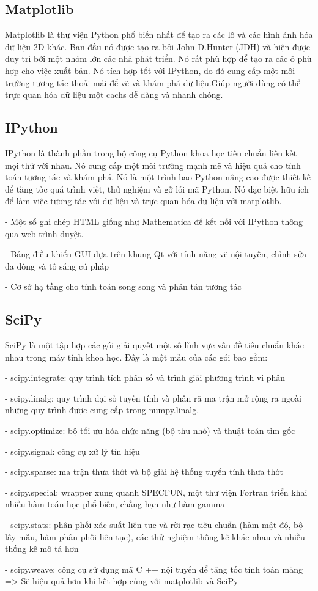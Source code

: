 \subsection{Matplotlib}
\quad Matplotlib là thư viện Python phổ biến nhất để tạo ra các lô và các hình ảnh hóa dữ liệu 2D khác. Ban đầu nó được tạo ra bởi John D.Hunter (JDH) và hiện được duy trì bởi một nhóm lớn các nhà phát triển. Nó rất phù hợp để tạo ra các ô phù hợp cho việc xuất bản. Nó tích hợp tốt với IPython, do đó cung cấp một môi trường tương tác thoải mái để vẽ và khám phá dữ liệu.Giúp người dùng có thể trực quan hóa dữ liệu một cachs dễ dàng và nhanh chóng.

\subsection{IPython}
\quad IPython là thành phần trong bộ công cụ Python khoa học tiêu chuẩn liên kết mọi thứ với nhau. Nó cung cấp một môi trường mạnh mẽ và hiệu quả cho tính toán tương tác và khám phá. Nó là một trình bao Python nâng cao được thiết kế để tăng tốc quá trình viết, thử nghiệm và gỡ lỗi mã Python. Nó đặc biệt hữu ích để làm việc tương tác với dữ liệu và trực quan hóa dữ liệu với matplotlib.\par
- Một sổ ghi chép HTML giống như Mathematica để kết nối với IPython thông qua web
trình duyệt.\par
- Bảng điều khiển GUI dựa trên khung Qt với tính năng vẽ nội tuyến, chỉnh sửa đa dòng và tô sáng cú pháp\par
- Cơ sở hạ tầng cho tính toán song song và phân tán tương tác
\subsection{SciPy}
\quad SciPy là một tập hợp các gói giải quyết một số lĩnh vực vấn đề tiêu chuẩn khác nhau trong máy tính khoa học. Đây là một mẫu của các gói bao gồm:\par
- scipy.integrate: quy trình tích phân số và trình giải phương trình vi phân\par
- scipy.linalg: quy trình đại số tuyến tính và phân rã ma trận mở rộng ra ngoài những quy trình được cung cấp trong numpy.linalg.\par
- scipy.optimize: bộ tối ưu hóa chức năng (bộ thu nhỏ) và thuật toán tìm gốc\par
- scipy.signal: công cụ xử lý tín hiệu\par
- scipy.sparse: ma trận thưa thớt và bộ giải hệ thống tuyến tính thưa thớt\par
- scipy.special: wrapper xung quanh SPECFUN, một thư viện Fortran triển khai nhiều hàm toán học phổ biến, chẳng hạn như hàm gamma\par
- scipy.stats: phân phối xác suất liên tục và rời rạc tiêu chuẩn (hàm mật độ, bộ lấy mẫu, hàm phân phối liên tục), các thử nghiệm thống kê khác nhau và nhiều thống kê mô tả hơn\par
- scipy.weave: công cụ sử dụng mã C ++ nội tuyến để tăng tốc tính toán mảng\\
=> Sẽ hiệu quả hơn khi kết hợp cùng với matplotlib và SciPy
